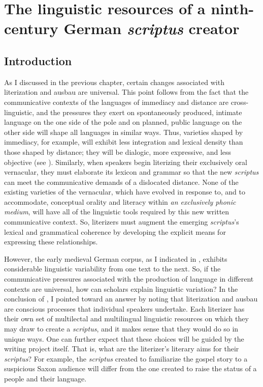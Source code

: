 \chapter{The linguistic resources of a ninth-century German \textit{scriptus} creator}\label{sec:chap:5}

\section{Introduction}
As I discussed in the previous chapter, certain changes associated with literization and ausbau are universal. This point follows from the fact that the communicative contexts of the languages of immediacy and distance are cross-linguistic, and the pressures they exert on spontaneously produced, intimate language on the one side of the pole and on planned, public language on the other side will shape all languages in similar ways. Thus, varieties shaped by immediacy, for example, will exhibit less integration and lexical density than those shaped by distance; they will be dialogic, more expressive, and less objective (see ). Similarly, when speakers begin literizing their exclusively oral vernacular, they must elaborate its lexicon and grammar so that the new \textit{scriptus} can meet the communicative demands of a dislocated distance. None of the existing varieties of the vernacular, which have evolved in response to, and to accommodate, conceptual orality and literacy within \textit{an exclusively phonic medium}, will have all of the linguistic tools required by this new written communicative context. So, literizers must augment the emerging \textit{scriptus}’s lexical and grammatical coherence by developing the explicit means for expressing these relationships.

However, the early medieval German corpus, as I indicated in , exhibits considerable linguistic variability from one text to the next. So, if the communicative pressures associated with the production of language in different contexts are universal, how can scholars explain linguistic variation? In the conclusion of , I pointed toward an answer by noting that literization and ausbau are conscious processes that individual speakers undertake. Each literizer has their own set of multilectal and multilingual linguistic resources on which they may draw to create a \textit{scriptus}, and it makes sense that they would do so in unique ways. One can further expect that these choices will be guided by the writing project itself. That is, what are the literizer’s literary aims for their \textit{scriptus}? For example, the \textit{scriptus} created to familiarize the gospel story to a suspicious Saxon audience will differ from the one created to raise the status of a people and their language.

